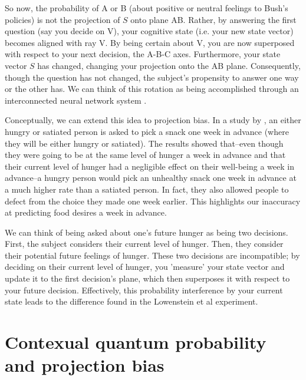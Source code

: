\documentclass[12pt]{article}
\begin{document}
	So now, the probability of A or B (about positive or neutral feelings to Bush's policies) is not the projection of $S$ onto plane AB. Rather, by answering the first question (say you decide on V), your cognitive state (i.e. your new state vector) becomes aligned with ray V. By being certain about V, you are now superposed with respect to your next decision, the A-B-C axes.  Furthermore, your state vector $S$ has changed, changing your projection onto the AB plane. Consequently, though the question has not changed, the subject's propensity to answer one way or the other has. We can think of this rotation as being accomplished through an interconnected neural network system \citep{stewart_eliasmith_2013}.
	
	Conceptually, we can extend this idea to projection bias. In a study by \cite{read_leeuwen_1998}, an either hungry or satiated person is asked to pick a snack one week in advance (where they will be either hungry or satiated). The results showed that--even though they were going to be at the same level of hunger a week in advance and that their current level of hunger had a negligible effect on their well-being a week in advance--a hungry person would pick an unhealthy snack one week in advance at a much higher rate than a satiated person. In fact, they also allowed people to defect from the choice they made one week earlier. This highlights our inaccuracy at predicting food desires a week in advance. 
	
	We can think of being asked about one's future hunger as being two decisions. First, the subject considers their current level of hunger. Then, they consider their potential future feelings of hunger. These two decisions are incompatible; by deciding on their current level of hunger, you 'measure' your state vector and update it to the first decision's plane, which then superposes it with respect to your future decision. Effectively, this probability interference by your current state leads to the difference found in the Lowenstein et al experiment.  

	\section{Contexual quantum probability and projection bias}
	 
\end{document}
